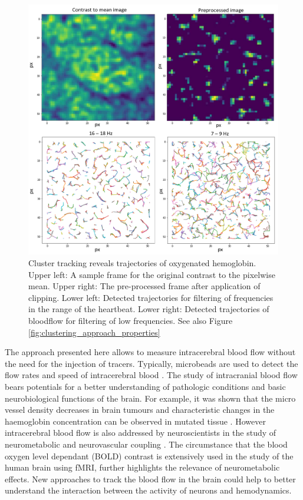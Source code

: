 \begin{figure}[!htb]
\centering
\includegraphics[width=\textwidth,height=\textheight,keepaspectratio]{Figures/clustering_approach_results}
\decoRule
\caption[Cluster tracking reveals trajectories of oxygenated hemoglobin]{Cluster tracking reveals trajectories of oxygenated hemoglobin.\\
Upper left: A sample frame for the original contrast to the pixelwise mean. Upper right: The pre-processed frame after application of clipping. Lower left: Detected trajectories for filtering of frequencies in the range of the heartbeat. Lower right: Detected trajectories of bloodflow for filtering of low frequencies. See also Figure \ref{fig:clustering_approach_properties}}
\label{fig:clustering_approach_results}
\end{figure}
The approach presented here allows to measure intracerebral blood flow without the need for the injection of tracers. Typically, microbeads are used to detect the flow rates and speed of intracerebral blood \parencite{kim2019development}. The study of intracranial blood flow bears potentials for a better understanding of pathologic conditions and basic neurobiological functions of the brain. For example, it was shown that the micro vessel density decreases in brain tumours and characteristic changes in the haemoglobin concentration can be observed in mutated tissue \parencite{lee2014vivo}. However intracerebral blood flow is also addressed by neuroscientists in the study of neurometabolic and neurovascular coupling \parencite{devor2012frontiers}. The circumstance that the blood oxygen level dependant (BOLD) contrast is extensively used in the study of the human brain using fMRI, further highlights the relevance of neurometabolic effects. New approaches to track the blood flow in the brain could help to better understand the interaction between the activity of neurons and hemodynamics.\\
